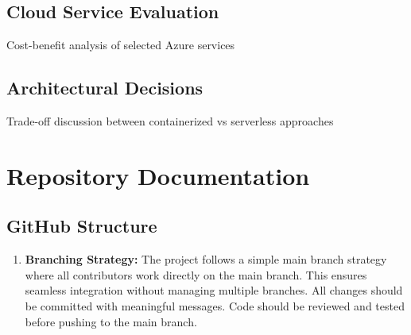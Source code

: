 \documentclass{llncs}
\begin{document}
\subsection{Cloud Service Evaluation}
Cost-benefit analysis of selected Azure services
\subsection{Architectural Decisions}
Trade-off discussion between containerized vs serverless approaches

\section{Repository Documentation}
\subsection{GitHub Structure}


\begin{enumerate}
    \item \textbf{Branching Strategy:} \newline 
     The project follows a simple main branch strategy where all contributors work directly on the main branch.  
    This ensures seamless integration without managing multiple branches. All changes should be committed with meaningful messages.  
    Code should be reviewed and tested before pushing to the main branch.
\end{enumerate}
\end{document}
